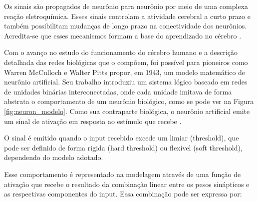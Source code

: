 \begin{figure}[h!]
		\centering
\end{figure}


Os sinais são propagados de neurônio para neurônio por meio de uma complexa reação eletroquímica. Esses sinais controlam a atividade cerebral a curto prazo e também possibilitam mudanças de longo prazo na conectividade dos neurônios. Acredita-se que esses mecanismos formam a base do aprendizado no cérebro \cite{russell_artificial_2016}.

Com o avanço no estudo do funcionamento do cérebro humano e a descrição detalhada das redes biológicas que o compõem, foi possível para pioneiros como Warren McCulloch e Walter Pitts propor, em 1943, um modelo matemático de neurônio artificial. Seu trabalho introduziu um sistema lógico baseado em redes de unidades binárias interconectadas, onde cada unidade imitava de forma abstrata o comportamento de um neurônio biológico, como se pode ver na Figura \ref{fig:neuron_modelo}. Como sua contraparte biológica, o neurônio artificial emite um sinal de ativação em resposta ao estímulo que recebe \cite{mcculloch_logical_1943}.

\begin{figure}[h!]
		\centering
\end{figure}

O sinal é emitido quando o input recebido excede um limiar (threshold), que pode ser definido de forma rígida (hard threshold) ou flexível (soft threshold), dependendo do modelo adotado.

Esse comportamento é representado na modelagem através de uma função de ativação que recebe o resultado da combinação linear entre os pesos sinápticos e as respectivas componentes do input. Essa combinação pode ser expressa por:

